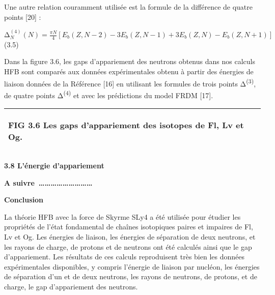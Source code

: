 \documentclass[a4paper]{article}
\begin{document}
 Une autre relation couramment utilisée est la formule de la différence de quatre points [20] :

  $∆_N^{\left(4\right)}\left(N\right)=\frac{\mathit{πN}} 4[E_b\left(Z,N-2\right)-3E_b\left(Z,N-1\right)+3E_b\left(Z,N\right)-E_b\left(Z,N+1\right)]$ (3.5)

 Dans la figure 3.6, les gaps d’appariement des neutrons obtenus dans nos calculs HFB sont comparés aux données expérimentales obtenu à partir des énergies de liaison données de la Référence [16] en utilisant les formules de trois points Δ\textsuperscript{(3)}, de quatre points Δ\textsuperscript{(4)} et avec les prédictions du model FRDM [17]. 

\begin{flushleft}
\tablefirsthead{}
\tablehead{}
\tabletail{}
\tablelasttail{}
\begin{supertabular}{|m{6.4018598in}|}
\hline
{\begin{french}  FIG 3.6 Les gaps d’appariement des isotopes de Fl, Lv et Og.\end{french}}\\\hline
\end{supertabular}
\end{flushleft}
\textbf{3.8 L’énergie d’appariement}

\textbf{ A suivre~………………………}

\textbf{Conclusion}

La théorie HFB avec la force de Skyrme SLy4 a été utilisée pour étudier les propriétés de l’état fondamental de chaînes isotopiques paires et impaires de Fl, Lv et Og. Les énergies de liaison, les énergies de séparation de deux neutrons, et les rayons de charge, de protons et de neutrons ont été calculés ainsi que le gap d’appariement. Les résultats de ces calculs reproduisent très bien les données expérimentales disponibles, y compris l’énergie de liaison par nucléon, les énergies de séparation d’un et de deux neutrons, les rayons de neutrons, de protons, et de charge, le gap d’appariement des neutrons. 

\section[]{}
\section{}
\section{}
\end{document}
